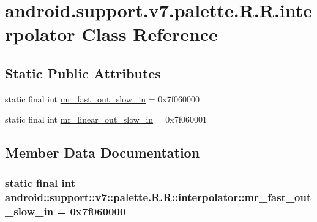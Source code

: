 \hypertarget{classandroid_1_1support_1_1v7_1_1palette_1_1_r_1_1interpolator}{
\section{android.support.v7.palette.R.R.interpolator Class Reference}
\label{classandroid_1_1support_1_1v7_1_1palette_1_1_r_1_1interpolator}
}
\subsection*{Static Public Attributes}
\begin{CompactItemize}
\item 
static final int \hyperlink{classandroid_1_1support_1_1v7_1_1palette_1_1_r_1_1interpolator_6f354200b40c323d7ab02829b3a9ac12}{mr\_\-fast\_\-out\_\-slow\_\-in} = 0x7f060000
\item 
static final int \hyperlink{classandroid_1_1support_1_1v7_1_1palette_1_1_r_1_1interpolator_c75ef5fe6f5e1173a9b60706cb080a9c}{mr\_\-linear\_\-out\_\-slow\_\-in} = 0x7f060001
\end{CompactItemize}


\subsection{Member Data Documentation}
\hypertarget{classandroid_1_1support_1_1v7_1_1palette_1_1_r_1_1interpolator_6f354200b40c323d7ab02829b3a9ac12}{
\subsubsection[{mr\_\-fast\_\-out\_\-slow\_\-in}]{\setlength{\rightskip}{0pt plus 5cm}static final int android::support::v7::palette.R.R::interpolator::mr\_\-fast\_\-out\_\-slow\_\-in = 0x7f060000}}
\label{classandroid_1_1support_1_1v7_1_1palette_1_1_r_1_1interpolator_6f354200b40c323d7ab02829b3a9ac12}


